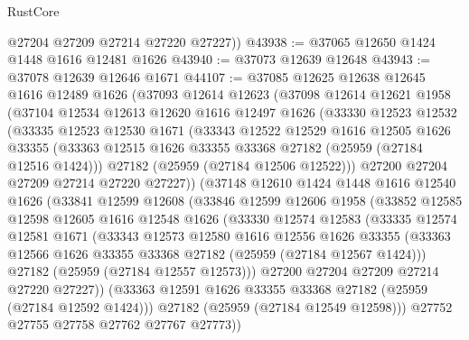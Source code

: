 \begin{lexlean}{RustCore}
\begin{coremodule}
        @27204
        @27209
        @27214
        @27220
        @27227))
@43938 := @37065 @12650 @1424 @1448 @1616 @12481 @1626
@43940 := @37073 @12639 @12648
@43943 := @37078 @12639 @12646 @1671
@44107 := @37085
    @12625
    @12638
    @12645
    @1616
    @12489
    @1626
    (@37093
      @12614
      @12623
      (@37098
        @12614
        @12621
        @1958
        (@37104
          @12534
          @12613
          @12620
          @1616
          @12497
          @1626
          (@33330
            @12523
            @12532
            (@33335
              @12523
              @12530
              @1671
              (@33343
                @12522
                @12529
                @1616
                @12505
                @1626
                @33355
                (@33363 @12515 @1626 @33355 @33368 @27182 (@25959 (@27184 @12516 @1424)))
                @27182
                (@25959 (@27184 @12506 @12522)))
              @27200
              @27204
              @27209
              @27214
              @27220
              @27227))
          (@37148
            @12610
            @1424
            @1448
            @1616
            @12540
            @1626
            (@33841
              @12599
              @12608
              (@33846
                @12599
                @12606
                @1958
                (@33852
                  @12585
                  @12598
                  @12605
                  @1616
                  @12548
                  @1626
                  (@33330
                    @12574
                    @12583
                    (@33335
                      @12574
                      @12581
                      @1671
                      (@33343
                        @12573
                        @12580
                        @1616
                        @12556
                        @1626
                        @33355
                        (@33363 @12566 @1626 @33355 @33368 @27182 (@25959 (@27184 @12567 @1424)))
                        @27182
                        (@25959 (@27184 @12557 @12573)))
                      @27200
                      @27204
                      @27209
                      @27214
                      @27220
                      @27227))
                  (@33363 @12591 @1626 @33355 @33368 @27182 (@25959 (@27184 @12592 @1424)))
                  @27182
                  (@25959 (@27184 @12549 @12598)))
                @27752
                @27755
                @27758
                @27762
                @27767
                @27773))

\end{coremodule}
\end{lexlean}

